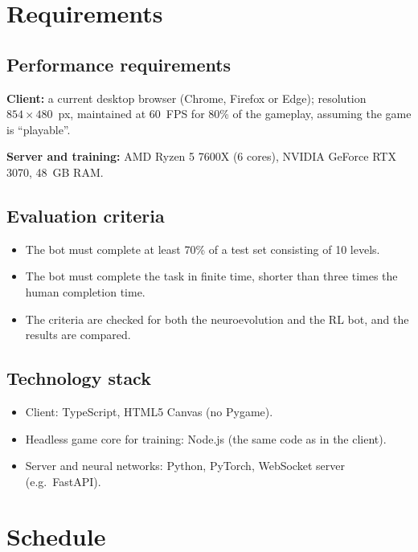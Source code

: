 \documentclass[11pt,a4paper]{article}
\begin{document}
\section{Requirements}

\subsection{Performance requirements}

\textbf{Client:} a current desktop browser (Chrome, Firefox or Edge); resolution
$854\times480$~px, maintained at 60~FPS for 80\% of the gameplay, assuming the game is
``playable''.

\textbf{Server and training:} AMD Ryzen 5 7600X (6 cores), NVIDIA GeForce RTX 3070, 48~GB RAM.

\subsection{Evaluation criteria}

\begin{itemize}
  \item The bot must complete at least 70\% of a test set consisting of 10 levels.
  \item The bot must complete the task in finite time, shorter than three times the
        human completion time.
  \item The criteria are checked for both the neuroevolution and the RL bot, and the results
        are compared.
\end{itemize}

\subsection{Technology stack}

\begin{itemize}
  \item Client: TypeScript, HTML5 Canvas (no Pygame).
  \item Headless game core for training: Node.js (the same code as in the client).
  \item Server and neural networks: Python, PyTorch, WebSocket server (e.g.\ FastAPI).
\end{itemize}

\section{Schedule}
\end{document}

